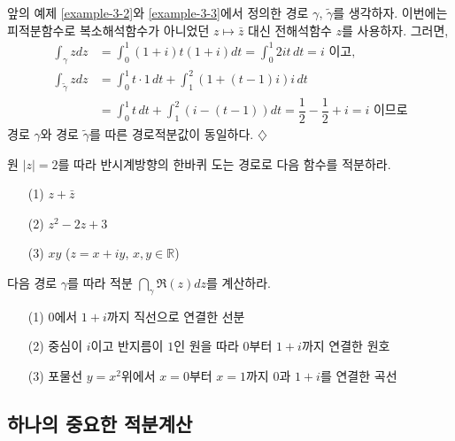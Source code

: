 \begin{saltexample}[label=example-3-4]{}{}
앞의 예제 \ref{example-3-2}와   \ref{example-3-3}에서 정의한
경로 $\gamma$, $\tilde\gamma$를 생각하자.
이번에는 피적분함수로 복소해석함수가 아니었던 $z\mapsto\bar z$ 대신 
전해석함수 $z$를 사용하자. 그러면,
\begin{align*}
\int_\gamma z dz 
&= \int_0^1 (1+i)t(1+i)dt = \int_0^1 2it\,dt = i \text{ 이고,} \\
\int_{\tilde\gamma} z dz
&= \int_0^1 t\cdot1\, dt + \int_1^2 (1+(t-1)i)i\, dt \\
&= \int_0^1 t\, dt + \int_1^2 (i-(t-1))dt
= \dfrac 12 - \dfrac12 + i = i  \text{ 이므로}
\end{align*}
경로 $\gamma$와 경로 $\tilde\gamma$를 따른  경로적분값이 동일하다.
\hfill $\diamondsuit$
\end{saltexample}

\begin{salt_exercise} \label{ex-3-3}
원 $|z|=2$를 따라 반시계방향의 한바퀴 도는 경로로 다음 함수를 적분하라.
\begin{itemize}
\item[(1)] $z+\bar z$
\item[(2)] $z^2-2z+3$
\item[(3)] $xy$ ($z=x+iy$, $x,y\in\mathbb R$)
\end{itemize}
\end{salt_exercise}


\begin{salt_exercise} \label{ex-3-4}
다음 경로 $\gamma$를 따라 적분 $\dint_\gamma \Re(z)dz$를 계산하라.
\begin{itemize}
\item[(1)] $0$에서 $1+i$까지 직선으로 연결한 선분
\item[(2)] 중심이 $i$이고 반지름이 $1$인 원을 따라 $0$부터 $1+i$까지 연결한 원호
\item[(3)] 포물선 $y=x^2$위에서 $x=0$부터 $x=1$까지 $0$과 $1+i$를 연결한 곡선
\end{itemize}
\end{salt_exercise}

\subsection{하나의 중요한 적분계산}

